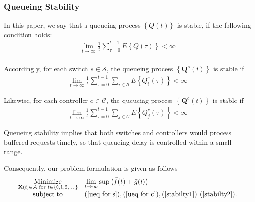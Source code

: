\documentclass[10pt,journal,compsoc]{IEEEtran}
\begin{document}
\subsubsection{Queueing Stability}

In this paper, we say that a queueing process $\left\{{Q}(t)\right\}$ is stable, if the following condition holds:
\begin{equation}
	\begin{array}{c}
		\displaystyle \lim_{t \to \infty} \frac{1}{t} \sum_{\tau=0}^{t-1} E\left\{Q(\tau)\right\} < \infty \\ 
	\end{array}
\end{equation}

Accordingly, for each switch $s \in \mathcal{S}$, the queueing process $\left\{ \mathbf{Q}^s(t) \right\}$ is stable if
\begin{equation}\label{stabilty2}
	\begin{array}{c}
		\displaystyle \lim_{t \to \infty} \frac{1}{t} \sum_{\tau=0}^{t-1} \sum_{i \in \mathcal{S}} E\left\{Q^s_i(\tau)\right\} < \infty
	\end{array}
\end{equation}

Likewise, for each controller $c \in \mathcal{C}$, the queueing process $\left\{ \mathbf{Q}^c(t) \right\}$ is stable if
\begin{equation}\label{stabilty1}
	\begin{array}{c}
		\displaystyle \lim_{t \to \infty} \frac{1}{t} \sum_{\tau=0}^{t-1} \sum_{j \in \mathcal{C}} E\left\{Q^c_j(\tau)\right\} < \infty
	\end{array}
\end{equation}

Queueing stability implies that both switches and controllers would process buffered requests timely, so that queueing delay is controlled within a small range.

Consequently, our problem formulation is given as follows 
	\begin{equation}\label{ori-opt-pr}
		\begin{array}{cl}
			\displaystyle \underset{
			\mathbf{X}(t) \in \mathcal{A} \text{ for } t \in \{ 0,1,2,\dots \}
			}{\text{Minimize}} & \displaystyle \lim_{t \to \infty} \sup \left( \bar{f}(t) + \bar{g}(t) \right) \\
			\displaystyle \text{subject to} &  (\ref{ueq for s}), (\ref{ueq for c}), (\ref{stabilty1}), (\ref{stabilty2}).  \\
		\end{array}
	\end{equation}
	
\end{document}
